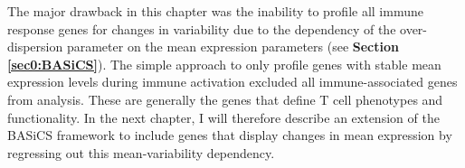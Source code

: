 The major drawback in this chapter was the inability to profile all immune response genes for changes in variability due to the dependency of the over-dispersion parameter on the mean expression parameters (see \textbf{Section \ref{sec0:BASiCS}}). 
The simple approach to only profile genes with stable mean expression levels during immune activation excluded all immune-associated genes from analysis. 
These are generally the genes that define T cell phenotypes and functionality. 
In the next chapter, I will therefore describe an extension of the BASiCS framework to include genes that display changes in mean expression by regressing out this mean-variability dependency.





